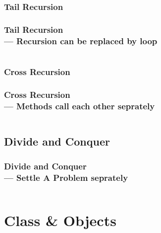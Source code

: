\documentclass[en, 11pt, xcolor=dvipsnames]{beamer}
\begin{document}
\subsubsection{Tail Recursion}
\begin{frame}[fragile]
	\frametitle{Tail Recursion \\ {\small --- Recursion can be replaced by loop}}

	\begin{columns}
		\begin{column}{0.98\textwidth}

		\end{column}
	\end{columns}

\end{frame}

\subsubsection{Cross Recursion}
\begin{frame}[fragile]
	\frametitle{Cross Recursion \\ {\small --- Methods call each other seprately}}

	\begin{columns}
		\begin{column}{0.98\textwidth}

		\end{column}
	\end{columns}

\end{frame}

\subsection{Divide and Conquer}
\begin{frame}[fragile]
	\frametitle{Divide and Conquer \\ {\small --- Settle A Problem seprately}}

	\begin{columns}
		\begin{column}{0.98\textwidth}

		\end{column}
	\end{columns}

\end{frame}

\section{Class \& Objects}
\end{document}
